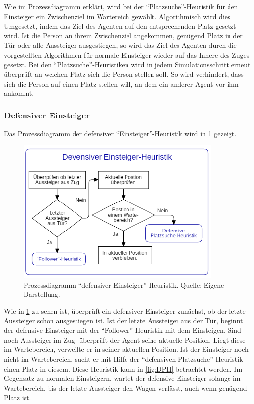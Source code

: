 Wie im Prozessdiagramm erklärt, wird bei der "`Platzsuche"'-Heuristik für den Einsteiger ein Zwischenziel im Wartereich gewählt. Algorithmisch wird dies Umgesetzt, indem das Ziel des Agenten auf den entsprechenden Platz gesetzt wird. Ist die Person an ihrem Zwischenziel angekommen, genügend Platz in der Tür oder alle Aussteiger ausgestiegen, so wird das Ziel des Agenten durch die vorgestellten Algorithmen für normale Einsteiger wieder auf das Innere des Zuges gesetzt. Bei den "`Platzsuche"'-Heuristiken wird in jedem Simulationsschritt erneut überprüft an welchen Platz sich die Person stellen soll. So wird verhindert, dass sich die Person auf einen Platz stellen will, an dem ein anderer Agent vor ihm ankommt.
\subsubsection{Defensiver Einsteiger}
Das Prozessdiagramm der defensiver "`Einsteiger"'-Heuristik wird in \ref{fig:DEH} gezeigt.
\begin{figure}[H]
	\centering
		\includegraphics[width=0.9\textwidth]{pictures/model/algorithm/boarding/defensive_boarding/defensive_boarding_heuristic.png}
	\caption{Prozessdiagramm "`defensiver Einsteiger"'-Heuristik. Quelle: Eigene Darstellung.}
	\label{fig:DEH}
\end{figure}
Wie in \figurename \ref{fig:DEH} zu sehen ist, überprüft ein defensiver Einsteiger zunächst, ob der letzte Aussteiger schon ausgestiegen ist.  Ist der letzte Aussteiger aus der Tür, beginnt der defensive Einsteiger mit der "`Follower"'-Heuristik mit dem Einsteigen. Sind noch Aussteiger im Zug, überprüft der Agent seine aktuelle Position. Liegt diese im Wartebereich, verweilte er in seiner aktuellen Position. Ist der Einsteiger noch nicht im Wartebereich, sucht er mit Hilfe der "`defensiven Platzsuche"'-Heuristik einen Platz in diesem. Diese Heuristik kann in \figurename \ref{fig:DPH} betrachtet werden. Im Gegensatz zu normalen Einsteigern, wartet der defensive Einsteiger solange im Wartebereich, bis der letzte Aussteiger den Wagon verlässt, auch wenn genügend Platz ist. 

